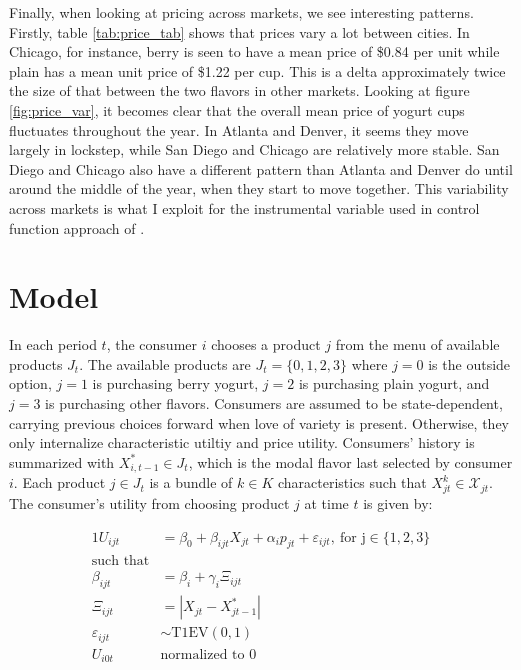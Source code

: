 \documentclass[11pt]{article}
\theoremstyle{definition}
\theoremstyle{remark}
\begin{document}
    Finally, when looking at pricing across markets, we see interesting patterns. Firstly, table \ref{tab:price_tab} shows that prices vary a lot between cities. In Chicago, for instance, berry is seen to have a mean price of \$0.84 per unit while plain has a mean unit price of \$1.22 per cup. This is a delta approximately twice the size of that between the two flavors in other markets. Looking at figure \ref{fig:price_var}, it becomes clear that the overall mean price of yogurt cups fluctuates throughout the year. In Atlanta and Denver, it seems they move largely in lockstep, while San Diego and Chicago are relatively more stable. San Diego and Chicago also have a different pattern than Atlanta and Denver do until around the middle of the year, when they start to move together. This variability across markets is what I exploit for the instrumental variable used in control function approach of \citet{petrin_control_2010}.

\section{Model}
    In each period $t$, the consumer $i$ chooses a product $j$ from the menu of available products $J_t$. The available products are $J_t = \{0,1,2,3\}$ where $j=0$ is the outside option, $j=1$ is purchasing berry yogurt, $j=2$ is purchasing plain yogurt, and $j=3$ is purchasing other flavors. Consumers are assumed to be state-dependent, carrying previous choices forward when love of variety is present. Otherwise, they only internalize characteristic utiltiy and price utility. Consumers' history is summarized with $X^*_{i,t-1}\in J_t$, which is the modal flavor last selected by consumer $i$. Each product $j\in J_t$ is a bundle of $k\in K$ characteristics such that $X_{jt}^k \in \mathcal{X}_{jt}$. The consumer's utility from choosing product $j$ at time $t$ is given by:


    \begin{alignat*}{1}
      U_{ijt} &= \beta_0 + \beta_{ijt}X_{jt}
                  + \alpha_i p_{jt} +  \varepsilon_{ijt}, \ \text{for j$\in\{1,2,3\}$} \\
    \text{such that} \\
      \beta_{ijt} &= \beta_i + \gamma_i\Xi_{ijt} \\
      \Xi_{ijt} &= |X_{jt} - X^*_{jt-1}| \\
      \varepsilon_{ijt} &\sim \text{T1EV}(0,1) \\
      \text{$U_{i0t}$}& \text{normalized to $0$}
    \end{alignat*}
\end{document}

